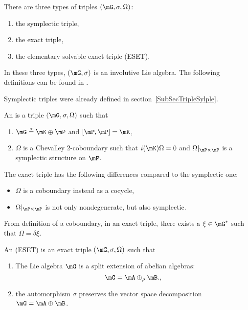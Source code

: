 There are three types of triples $(\mG,\sigma,\Omega)$:
\begin{enumerate}

	\item
	      the symplectic triple,
	\item
	      the exact triple, 
	\item
	      the elementary solvable exact triple (ESET). 
\end{enumerate}
In these three types, $(\mG,\sigma)$ is an involutive Lie algebra. The following definitions can be found in \cite{StrictSolvableSym}.

Symplectic triples were already defined in section~\ref{SubSecTripleSylple}.
\begin{definition}
	An  is a triple $(\mG,\sigma,\Omega)$ such that
	\begin{enumerate}
		\item $\mG\stackrel{\sigma}{=}\mK\oplus\mP$ and $[\mP,\mP]=\mK$,
		\item $\Omega$ is a Chevalley $2$-coboundary such that $i(\mK)\Omega=0$ and $\Omega|_{\mP\times\mP}$ is a symplectic structure on $\mP$.
	\end{enumerate}
\end{definition}
The exact triple has the following differences compared to the symplectic one:
\begin{itemize}
	\item $\Omega$ is a coboundary instead as a cocycle,
	\item $\Omega|_{\mP\times\mP}$ is not only nondegenerate, but also symplectic.
\end{itemize}
From definition of a coboundary, in an exact triple, there exists a $\xi\in\mG^*$ such that $\Omega=\delta\xi$.

\begin{definition}
	An  (ESET) is an exact triple $(\mG,\sigma,\Omega)$ such that
	\begin{enumerate}
		\item The Lie algebra $\mG$ is a split extension of abelian algebras:
		      \begin{equation}   \label{EqSplitmGABab}
			      \mG=\mA\oplus_{\rho}\mB.,
		      \end{equation}
		\item the automorphism $\sigma$ preserves the vector space decomposition $\mG=\mA\oplus\mB$.
	\end{enumerate}

\end{definition}

